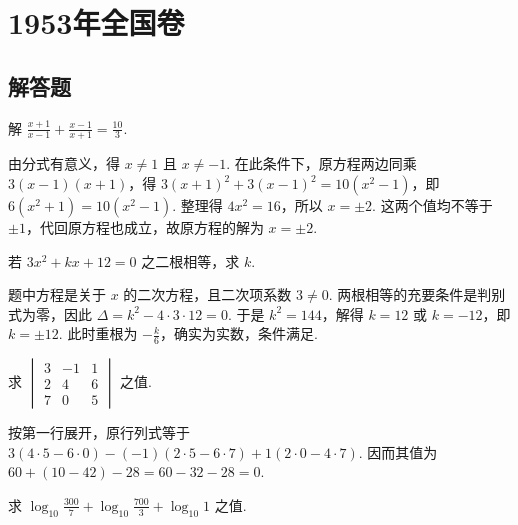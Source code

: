 \documentclass[UTF8,a4paper,oneside,11pt]{ctexbook}
\begin{document}
\mainmatter

\chapter{1953年全国卷}

\section{解答题}

\begin{problem}
解 \(\frac{x + 1}{x - 1} + \frac{x - 1}{x + 1} = \frac{10}{3}\).
\end{problem}

\begin{solution}
由分式有意义，得 \(x\ne1\) 且 \(x\ne-1\). 在此条件下，原方程两边同乘 \(3\left(x-1\right)\left(x+1\right)\)，得 \(3\left(x+1\right)^2+3\left(x-1\right)^2=10\left(x^2-1\right)\)，即 \(6\left(x^2+1\right)=10\left(x^2-1\right)\). 整理得 \(4x^2=16\)，所以 \(x=\pm2\). 这两个值均不等于 \(\pm1\)，代回原方程也成立，故原方程的解为 \(x=\pm2\).
\end{solution}

\begin{problem}
若 \(3x^{2} + kx + 12 = 0\) 之二根相等，求 \(k\).
\end{problem}

\begin{solution}
题中方程是关于 \(x\) 的二次方程，且二次项系数 \(3\ne0\). 两根相等的充要条件是判别式为零，因此 \(\Delta=k^2-4\cdot3\cdot12=0\). 于是 \(k^2=144\)，解得 \(k=12\) 或 \(k=-12\)，即 \(k=\pm12\). 此时重根为 \(-\frac{k}{6}\)，确实为实数，条件满足.
\end{solution}

\begin{problem}
求 \(\begin{vmatrix}3 & -1 & 1\\ 2 & 4 & 6\\ 7 & 0 & 5 \end{vmatrix}\) 之值.
\end{problem}

\begin{solution}
按第一行展开，原行列式等于 \(3\left(4\cdot5-6\cdot0\right)-\left(-1\right)\left(2\cdot5-6\cdot7\right)+1\left(2\cdot0-4\cdot7\right)\). 因而其值为 \(60+\left(10-42\right)-28=60-32-28=0\).
\end{solution}

\begin{problem}
求 \(\log_{10}\frac{300}{7} + \log_{10}\frac{700}{3} + \log_{10}1\) 之值.
\end{problem}
\end{document}
